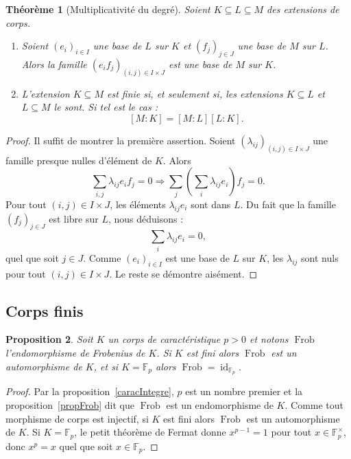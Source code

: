 \documentclass[a4paper, titlepage]{article}
\newtheorem{theo}{Théorème}[section]
\newtheorem{prop}[theo]{Proposition}
\theoremstyle{definition}
\theoremstyle{remark}
\def\F{\mathbb F}
\def\frob{\operatorname{Frob}}
\def\id{\operatorname{id}}
\begin{document}
\begin{theo}[Multiplicativité du degré]
Soient $K\subseteq L \subseteq M$ des extensions de corps. \begin{enumerate}
\item Soient ${(e_i)}_{i\in I}$ une base de $L$ sur $K$ et ${(f_j)}_{j\in J}$ une base de $M$ sur $L$. Alors la famille ${(e_if_j)}_{(i,j)\in I\times J}$ est une base de $M$ sur $K$.
\item L'extension $K \subseteq M$ est finie si, et seulement si, les extensions $K\subseteq L$ et $L \subseteq M$ le sont. Si tel est le cas :
$$[M:K] = [M:L][L:K].$$
\end{enumerate}
\end{theo}

\begin{proof}
Il suffit de montrer la première assertion. Soient ${(\lambda_{ij})}_{(i,j)\in I\times J}$ une famille presque nulles d'élément de $K$. Alors 
$$\sum_{i,j} \lambda_{ij} e_i f_j = 0 \Rightarrow \sum_j \left( \sum_i\lambda_{ij}e_i\right) f_j = 0.$$
Pour tout $(i,j) \in I\times J$, les éléments $\lambda_{ij}e_i$ sont dans $L$. Du fait que la famille ${(f_j)}_{j\in J}$ est libre sur $L$, nous déduisons :
$$\sum_i\lambda_{ij}e_i = 0,$$
quel que soit $j \in J$. Comme ${(e_i)}_{i\in I}$ est une base de $L$ sur $K$, les $\lambda_{ij}$ sont nuls pour tout $(i,j) \in I\times J$. Le reste se démontre aisément.
\end{proof}

\subsection{Corps finis}

\begin{prop}
Soit $K$ un corps de caractéristique $p > 0$ et notons $\frob$ l'endomorphisme de Frobenius de $K$. Si $K$ est fini alors $\frob$ est un automorphisme de $K$, et si $K = \F_p$ alors $\frob = \id_{\F_p}$.
\end{prop}

\begin{proof}
Par la proposition~\ref{caracIntegre}, $p$ est un nombre premier et la proposition~\ref{propFrob} dit que $\frob$ est un endomorphisme de $K$. Comme tout morphisme de corps est injectif, si $K$ est fini alors $\frob$ est un automorphisme de $K$. Si $K = \F_p$, le petit théorème de Fermat donne $x^{p-1} = 1$ pour tout $x \in \F_p^\times$, donc $x^p =x$ quel que soit $x \in\F_p$.
\end{proof}
\end{document}
